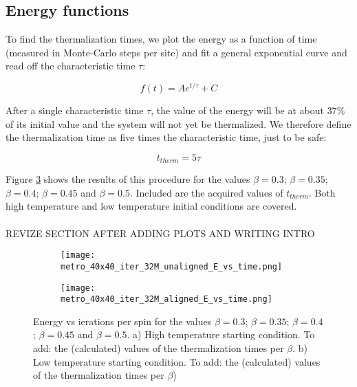 \documentclass[11pt,a4paper]{article}
\begin{document}
\subsection{Energy functions}
To find the thermalization times, we plot the energy as a function of time (measured in Monte-Carlo steps per site)
 and fit a general exponential curve and read off the characteristic time $\tau$:

\begin{equation}\label{eq:exp_decay}
    f(t)=Ae^{t/\tau} + C
\end{equation}

After a single characteristic time $\tau$, the value of the energy will be at about $37\%$ of its initial value and
 the system will not yet be thermalized. We therefore define the
 thermalization time as five times the characteristic time, just to be safe:
 
\begin{equation*}
    t_{therm} = 5\tau
\end{equation*}

Figure \ref{fig:Evt} shows the results of this procedure for the values $\beta = 0.3$; $\beta = 0.35$;
 $\beta = 0.4$; $\beta = 0.45$ and $\beta = 0.5$. Included are the acquired values of $t_{therm}$. Both 
 high temperature and low temperature initial conditions are covered.
\\
\\
{\color{red}REVIZE SECTION AFTER ADDING PLOTS AND WRITING INTRO}

\begin{figure}[h!]
\centering
\begin{subfigure}{.5\textwidth}
  \centering
  \texttt{[image: metro\_40x40\_iter\_32M\_unaligned\_E\_vs\_time.png]}
  \caption{}
  \label{fig:Evt_highT}
\end{subfigure}%
\begin{subfigure}{.5\textwidth}
  \centering
  \texttt{[image: metro\_40x40\_iter\_32M\_aligned\_E\_vs\_time.png]}
  \caption{}
  \label{fig:Evt_lowT}
\end{subfigure}
\caption{Energy vs ierations per spin for the values $\beta = 0.3$; $\beta = 0.35$;
         $\beta = 0.4$; $\beta = 0.45$ and $\beta = 0.5$. a) High temperature starting condition. 
         {\color{red}To add: the (calculated) values of the thermalization times per $\beta$}.
         b) Low temperature starting condition.
         {\color{red}To add: the (calculated) values of the thermalization times per $\beta$)}}
\label{fig:Evt}
\end{figure}
\end{document}
